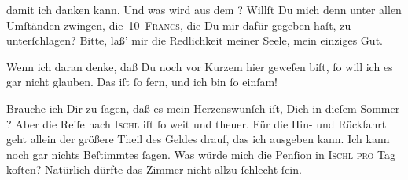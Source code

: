                damit ich danken kann. Und was wird aus dem \label{K_L02816-3v}\label{K_L02816-3}? Willſt Du mich denn unter
               allen Umſtänden zwingen, die 10 \textsc{Francs}, die Du mir dafür
               gegeben haſt, zu unterſchlagen? Bitte, laß’ mir die Redlichkeit meiner Seele, mein
               einziges Gut.\pend
           
\pstart
           {\pb}Wenn ich daran denke, daß Du noch vor Kurzem hier
               geweſen biſt,{ }ſo will ich es gar nicht glauben. Das iſt{ }ſo fern, und ich bin{ }ſo
               einſam!\pend
           
\pstart
           Brauche ich Dir zu{ }ſagen, daß es mein Herzenswunſch iſt, Dich in dieſem Sommer
                  \label{K_L02816-4v}\label{K_L02816-4}? Aber die Reiſe nach \textsc{Ischl} iſt{ }ſo weit und theuer. Für die Hin- und Rückfahrt geht allein \strikeout{\textcolor{gray}{×}\-\textcolor{gray}{×}\-\textcolor{gray}{×}\-\textcolor{gray}{×}} der größere Theil des Geldes drauf, das ich ausgeben  kann. Ich kann noch gar nichts Beſtimmtes{ }ſagen. Was würde mich die
               Penſion in \textsc{Ischl pro} Tag koſten? Natürlich dürfte
               das Zimmer nicht allzu{ }ſchlecht{ }ſein.\pend
           
